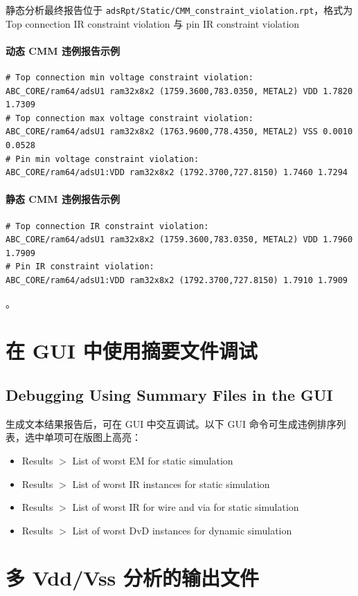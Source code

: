 静态分析最终报告位于 \texttt{adsRpt/Static/CMM\_constraint\_violation.rpt}，格式为 Top connection IR constraint violation 与 pin IR constraint violation
\paragraph{动态 CMM 违例报告示例}
\begin{lstlisting}
# Top connection min voltage constraint violation:
ABC_CORE/ram64/adsU1 ram32x8x2 (1759.3600,783.0350, METAL2) VDD 1.7820 1.7309
# Top connection max voltage constraint violation:
ABC_CORE/ram64/adsU1 ram32x8x2 (1763.9600,778.4350, METAL2) VSS 0.0010 0.0528
# Pin min voltage constraint violation:
ABC_CORE/ram64/adsU1:VDD ram32x8x2 (1792.3700,727.8150) 1.7460 1.7294
\end{lstlisting}

\paragraph{静态 CMM 违例报告示例}
\begin{lstlisting}
# Top connection IR constraint violation:
ABC_CORE/ram64/adsU1 ram32x8x2 (1759.3600,783.0350, METAL2) VDD 1.7960 1.7909
# Pin IR constraint violation:
ABC_CORE/ram64/adsU1:VDD ram32x8x2 (1792.3700,727.8150) 1.7910 1.7909
\end{lstlisting}
。

\section{在 GUI 中使用摘要文件调试}
\subsection*{Debugging Using Summary Files in the GUI}

生成文本结果报告后，可在 GUI 中交互调试。以下 GUI 命令可生成违例排序列表，选中单项可在版图上高亮：
\begin{itemize}
  \item Results $>$ List of worst EM for static simulation
  \item Results $>$ List of worst IR instances for static simulation
  \item Results $>$ List of worst IR for wire and via for static simulation
  \item Results $>$ List of worst DvD instances for dynamic simulation
\end{itemize}

\section{多 Vdd/Vss 分析的输出文件}
